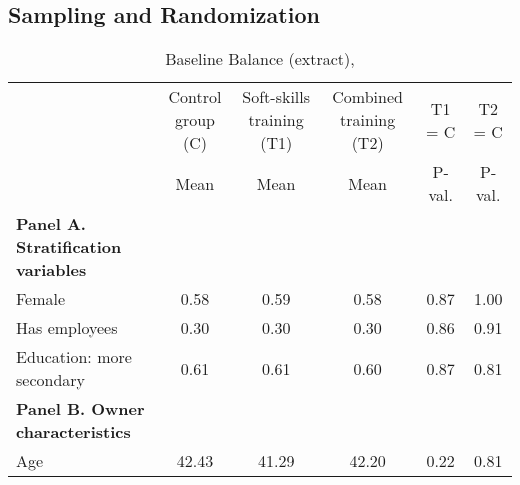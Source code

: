 \subsection{Sampling and Randomization}

\begin{table}
\centering
\caption{Baseline Balance (extract), \cite{Ubfal2022}}
\label{sum-baseline-balance}
\begin{adjustbox}{width=\textwidth}
\begin{tabular}{lccccc}
\toprule
                                                                                                      & Control group (C) & Soft-skills training (T1) & Combined training (T2) & T1 = C               & T2 = C                \\
                                                                                                      & Mean              & Mean                      & Mean                   & P-val.               & P-val.                \\ 
\hline
\textbf{Panel A. Stratification variables}                                                            &                   &                           &                        &                      &                       \\
Female                                                                                                & 0.58              & 0.59                      & 0.58                   & 0.87                 & 1.00                  \\
Has employees                                                                                         & 0.30              & 0.30                      & 0.30                   & 0.86                 & 0.91                  \\
Education: more secondary                                                                             & 0.61              & 0.61                      & 0.60                   & 0.87                 & 0.81                  \\
\textbf{Panel B. Owner characteristics}                                                               &                   &                           &                        &                      &                       \\
Age                                                                                                   & 42.43             & 41.29                     & 42.20                   & 0.22                 & 0.81                  \\

\end{tabular}
\end{adjustbox}
\end{table}
